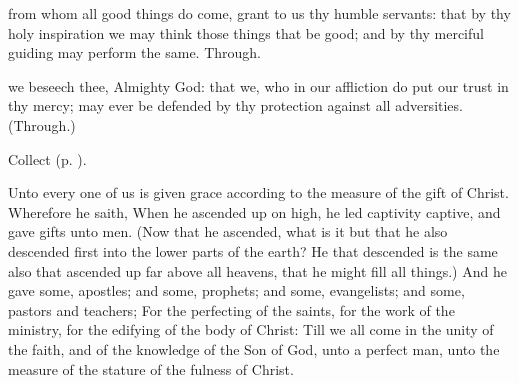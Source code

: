 \vspace{-0.25\baselineskip}

\collect

\vspace{-0.05\baselineskip}

 from whom all good things do come, grant to us thy humble servants: that by thy holy inspiration we may think those things that be good; and by thy merciful guiding may perform the same. Through.

 we beseech thee, Almighty God: that we, who in our affliction do put our trust in thy mercy; may ever be defended by thy protection against all adversities. (Through.)

\begin{rubric}
	 Collect  (p. \pageref{SPMaryInEaster}).
\end{rubric}


\vspace{-0.25\baselineskip}


\vspace{-0.1\baselineskip}

 Unto every one of us is given grace according to the measure of the gift of Christ. Wherefore he saith, When he ascended up on high, he led captivity captive, and gave gifts unto men. (Now that he ascended, what is it but that he also descended first into the lower parts of the earth? He that descended is the same also that ascended up far above all heavens, that he might fill all things.) And he gave some, apostles; and some, prophets; and some, evangelists; and some, pastors and teachers; For the perfecting of the saints, for the work of the ministry, for the edifying of the body of Christ: Till we all come in the unity of the faith, and of the knowledge of the Son of God, unto a perfect man, unto the measure of the stature of the fulness of Christ.


